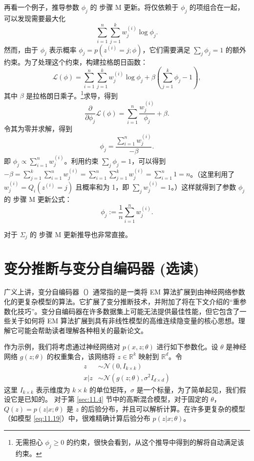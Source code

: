 再看一个例子，推导参数 $\phi_j$ 的 步骤 M 更新。将仅依赖于 $\phi_j$ 的项组合在一起，可以发现需要最大化
\[
    \sum_{i=1}^n \sum_{j=1}^k w_j^{(i)} \log \phi_j.
\]
然而，由于 $\phi_j$ 表示概率 $\phi_j = p(z^{(i)} = j; \phi)$，它们需要满足 $\sum_j \phi_j = 1$ 的额外约束。为了处理这个约束，构建拉格朗日函数：
\[
    \mathcal{L}(\phi) = \sum_{i=1}^n \sum_{j=1}^k w_j^{(i)} \log \phi_j + \beta (\sum_{j=1}^k \phi_j - 1),
\]
其中 $\beta$ 是拉格朗日乘子。\footnote{无需担心 $\phi_j \ge 0$ 的约束，很快会看到，从这个推导中得到的解将自动满足该约束。}求导，得到
\[
    \frac{\partial}{\partial \phi_j} \mathcal{L}(\phi) = \sum_{i=1}^n \frac{w_j^{(i)}}{\phi_j} + \beta.
\]
令其为零并求解，得到
\[
    \phi_j = \frac{\sum_{i=1}^n w_j^{(i)}}{-\beta}.
\]
即 $\phi_j \propto \sum_{i=1}^n w_j^{(i)}$。利用约束 $\sum_j \phi_j = 1$，可以得到 $-\beta = \sum_{j=1}^k \sum_{i=1}^n w_j^{(i)} = \sum_{i=1}^n \sum_{j=1}^k w_j^{(i)} = \sum_{i=1}^n 1 = n$。（这里利用了 $w_j^{(i)} = Q_i(z^{(i)} = j)$ 且概率和为 1，即 $\sum_j w_j^{(i)} = 1$。）这样就得到了参数 $\phi_j$ 的 步骤 M 更新公式：
\[
    \phi_j := \frac{1}{n} \sum_{i=1}^n w_j^{(i)}.
\]

对于 $\Sigma_j$ 的 步骤 M 更新推导也非常直接。

\section{变分推断与变分自编码器 (选读)}

广义上讲，变分自编码器（\cite{kingma2013auto}）通常指的是一类将 EM 算法扩展到由神经网络参数化的更复杂模型的算法。它扩展了变分推断技术，并附加了将在下文介绍的“重参数化技巧”。变分自编码器在许多数据集上可能无法提供最佳性能，但它包含了一些关于如何将 EM 算法扩展到具有非线性模型的高维连续隐变量的核心思想。理解它可能会帮助读者理解各种相关的最新论文。

作为示例，我们将考虑通过神经网络对 $p(x, z; \theta)$ 进行如下参数化。设 $\theta$ 是神经网络 $g(z; \theta)$ 的权重集合，该网络将 $z \in \mathbb{R}^k$ 映射到 $\mathbb{R}^d$。令
\begin{align}
    z &\sim \mathcal{N}(0, I_{k \times k}) \label{eq:11.18} \\
    x|z &\sim \mathcal{N}(g(z; \theta), \sigma^2 I_{d \times d}) \label{eq:11.19}
\end{align}
这里 $I_{k \times k}$ 表示维度为 $k \times k$ 的单位矩阵，$\sigma$ 是一个标量，为了简单起见，我们假设它是已知的。
对于第 \ref{sec:11.4} 节中的高斯混合模型，对于固定的 $\theta$， $Q(z) = p(z|x; \theta)$ 是 $z$ 的后验分布，并且可以解析计算。在许多更复杂的模型（如模型 \eqref{eq:11.19}）中，很难精确计算后验分布 $p(z|x; \theta)$。

